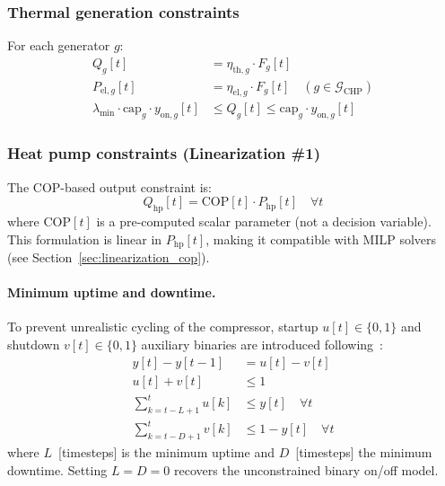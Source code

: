 \documentclass[a4paper,fleqn]{cas-dc}
\begin{document}
\subsubsection{Thermal generation constraints}

For each generator $g$:
\begin{align}
Q_g[t] &= \eta_{\mathrm{th},g} \cdot F_g[t] \label{eq:gen_eff} \\
P_{\mathrm{el},g}[t] &= \eta_{\mathrm{el},g} \cdot F_g[t] \quad (g \in \mathcal{G}_\mathrm{CHP}) \label{eq:chp_eff} \\
\lambda_\mathrm{min} \cdot \mathrm{cap}_g \cdot y_{\mathrm{on},g}[t] &\leq Q_g[t] \leq \mathrm{cap}_g \cdot y_{\mathrm{on},g}[t] \label{eq:gen_bounds}
\end{align}

\subsubsection{Heat pump constraints (Linearization \#1)}

The COP-based output constraint is:
\begin{equation}
Q_\mathrm{hp}[t] = \mathrm{COP}[t] \cdot P_\mathrm{hp}[t] \quad \forall t
\label{eq:hp_cop}
\end{equation}
where $\mathrm{COP}[t]$ is a pre-computed scalar parameter (not a decision variable). This formulation is linear in $P_\mathrm{hp}[t]$, making it compatible with MILP solvers (see Section~\ref{sec:linearization_cop}).

\paragraph{Minimum uptime and downtime.}
To prevent unrealistic cycling of the compressor, startup $u[t]\in\{0,1\}$ and shutdown $v[t]\in\{0,1\}$ auxiliary binaries are introduced following~\citet{Carrion2006}:
\begin{align}
y[t] - y[t{-}1] &= u[t] - v[t] \label{eq:hp_transition} \\
u[t] + v[t]     &\leq 1 \label{eq:hp_no_simult} \\
\sum_{k=t-L+1}^{t} u[k] &\leq y[t] \quad \forall t \label{eq:hp_uptime} \\
\sum_{k=t-D+1}^{t} v[k] &\leq 1 - y[t] \quad \forall t \label{eq:hp_downtime}
\end{align}
where $L$~[timesteps] is the minimum uptime and $D$~[timesteps] the minimum downtime. Setting $L = D = 0$ recovers the unconstrained binary on/off model.
\end{document}
